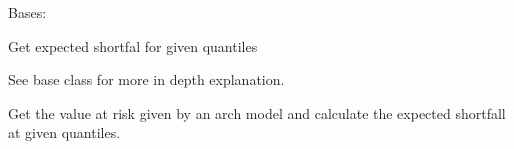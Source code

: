 \documentclass[letterpaper,10pt,english]{sphinxmanual}
\begin{document}

\begin{fulllineitems}
\label{\detokenize{dalio.pipe:dalio.pipe.ExpectedShortfall}}
Bases: {\hyperref[\detokenize{dalio.pipe:dalio.pipe.builders.ValueAtRisk}]{}}

Get expected shortfal for given quantiles

See base class for more in depth explanation.

\begin{fulllineitems}
\label{\detokenize{dalio.pipe:dalio.pipe.ExpectedShortfall.transform}}
Get the value at risk given by an arch model and calculate the
expected shortfall at given quantiles.

\end{fulllineitems}


\end{fulllineitems}

\end{document}
